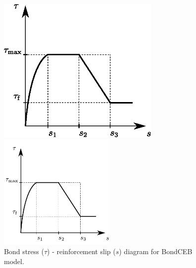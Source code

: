 \documentclass[a4paper]{article}
\begin{document}
\begin{figure}[!htb]
\begin{htmlonly}
  \centerline{\includegraphics[width=0.7\textwidth]{bondceb_diag.eps}}
\end{htmlonly}
 \centerline{\includegraphics[width=0.5\textwidth]{bondceb_diag}}
  \caption{Bond stress ($\tau$) - reinforcement slip ($s$) diagram for BondCEB model.}
  \label{BondCEB}
\end{figure}
\end{document}
